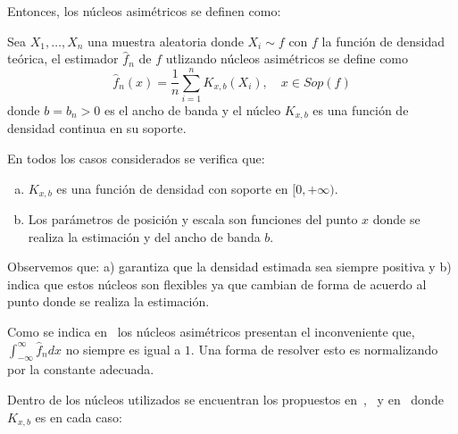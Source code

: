 Entonces, los núcleos asimétricos se definen como:


\begin{definition}
\label{DefNucleo}
Sea $X_1, \ldots, X_n$ una muestra aleatoria donde $X_i \sim f$ con $f$ la función de densidad teórica, el estimador $\widehat{f}_n$ de $f$ utlizando núcleos asimétricos se define como 
\begin{equation}
\widehat{f}_n(x)=\frac{1}{n}\sum_{i=1}^n K_{x,b}(X_i), \quad x \in Sop(f)
\label{fn}
\end{equation}
donde  $b=b_n>0$ es el ancho de banda  y el núcleo $K_{x,b}$ es una función de densidad continua en su soporte.
\end{definition}

En todos los casos considerados se verifica que:

\begin{enumerate}[a)]
	\item $K_{x,b}$ es una función de densidad con soporte en $[0,+\infty)$.
	\item Los parámetros de posición y escala son funciones del punto $x$ donde se realiza la estimación y del ancho de banda $b$.
\end{enumerate}
Observemos que: a) garantiza que la densidad estimada sea siempre positiva y b) indica que estos núcleos son flexibles ya que cambian de forma de acuerdo al punto donde se realiza la estimación.

Como se indica en~\cite{Libnegue2013,Hirukawa2018} los núcleos asimétricos presentan el inconveniente que, $\int_{-\infty}^{\infty} \widehat{f}_n dx$ no siempre es igual a $1$. Una forma de resolver esto es normalizando por la constante adecuada.

Dentro de los núcleos utilizados se encuentran los propuestos en~\cite{chensx2000},~\cite{bouezmarni2005} y en~\cite{Libnegue2013} donde $K_{x,b}$ es en cada caso: 

